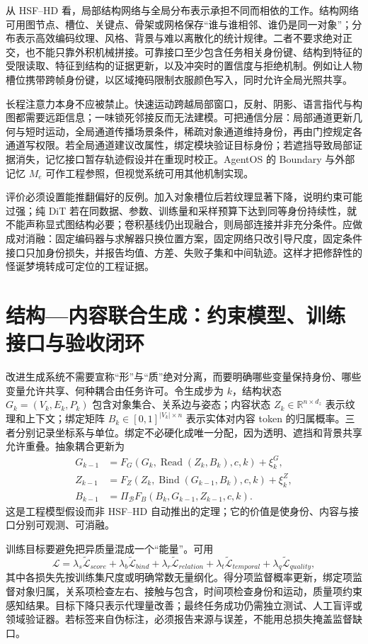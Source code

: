 从 HSF--HD 看，局部结构网络与全局分布表示承担不同而相依的工作。结构网络可用图节点、槽位、关键点、骨架或网格保存“谁与谁相邻、谁仍是同一对象”；分布表示高效编码纹理、风格、背景与难以离散化的统计规律。二者不要求绝对正交，也不能只靠外积机械拼接。可靠接口至少包含任务相关身份键、结构到特征的受限读取、特征到结构的证据更新，以及冲突时的置信度与拒绝机制。例如让人物槽位携带跨帧身份键，以区域掩码限制衣服颜色写入，同时允许全局光照共享。

长程注意力本身不应被禁止。快速运动跨越局部窗口，反射、阴影、语言指代与构图都需要远距信息；一味锁死邻接反而无法建模。可把通信分层：局部通道更新几何与短时运动，全局通道传播场景条件，稀疏对象通道维持身份，再由门控规定各通道写权限。若全局通道建议改属性，绑定模块验证目标身份；若遮挡导致局部证据消失，记忆接口暂存轨迹假设并在重现时校正。AgentOS 的 Boundary 与外部记忆 $M_e$ 可作工程参照，但视觉系统可用其他机制实现。

评价必须设置能推翻偏好的反例。加入对象槽位后若纹理显著下降，说明约束可能过强；纯 DiT 若在同数据、参数、训练量和采样预算下达到同等身份持续性，就不能声称显式图结构必要；卷积基线仍出现融合，则局部连接并非充分条件。应做成对消融：固定编码器与求解器只换位置方案，固定网络只改引导尺度，固定条件接口只加身份损失，并报告均值、方差、失败子集和中间轨迹。这样才把修辞性的怪诞梦境转成可定位的工程证据。

\section{结构—内容联合生成：约束模型、训练接口与验收闭环}
\label{sec:reconstructing_creator}

改进生成系统不需要宣称“形”与“质”绝对分离，而要明确哪些变量保持身份、哪些变量允许共享、何种耦合由任务许可。令生成步为 $k$，结构状态 $G_k=(V_k,E_k,P_k)$ 包含对象集合、关系边与姿态；内容状态 $Z_k\in\mathbb{R}^{n\times d_z}$ 表示纹理和上下文；绑定矩阵 $B_k\in[0,1]^{|V_k|\times n}$ 表示实体对内容 token 的归属概率。三者分别记录坐标系与单位。绑定不必硬化成唯一分配，因为透明、遮挡和背景共享允许重叠。抽象耦合更新为
\begin{align}
G_{k-1}&=F_G(G_k,\operatorname{Read}(Z_k,B_k),c,k)+\xi_k^G,\\
Z_{k-1}&=F_Z(Z_k,\operatorname{Bind}(G_{k-1},B_k),c,k)+\xi_k^Z,\\
B_{k-1}&=\Pi_{\mathcal B}F_B(B_k,G_{k-1},Z_{k-1},c,k).
\end{align}
这是工程模型假设而非 HSF--HD 自动推出的定理；它的价值是使身份、内容与接口分别可观测、可消融。

训练目标要避免把异质量混成一个“能量”。可用
\begin{equation}
\mathcal L=\lambda_s\widetilde{\mathcal L}_{score}+\lambda_b\widetilde{\mathcal L}_{bind}
+\lambda_r\widetilde{\mathcal L}_{relation}+\lambda_t\widetilde{\mathcal L}_{temporal}
+\lambda_q\widetilde{\mathcal L}_{quality},
\end{equation}
其中各损失先按训练集尺度或明确常数无量纲化。得分项监督概率更新，绑定项监督对象归属，关系项检查左右、接触与包含，时间项检查身份和运动，质量项约束感知结果。目标下降只表示代理量改善；最终任务成功仍需独立测试、人工盲评或领域验证器。若标签来自伪标注，必须报告来源与误差，不能用总损失掩盖监督缺口。


